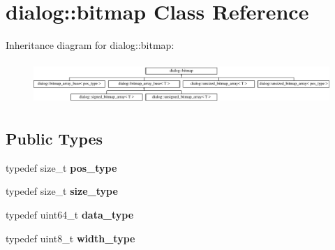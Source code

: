 \hypertarget{classdialog_1_1bitmap}{}\section{dialog\+:\+:bitmap Class Reference}
\label{classdialog_1_1bitmap}
Inheritance diagram for dialog\+:\+:bitmap\+:\begin{figure}[H]
\begin{center}
\leavevmode
\includegraphics[height=1.621622cm]{classdialog_1_1bitmap}
\end{center}
\end{figure}
\subsection*{Public Types}
\begin{DoxyCompactItemize}
\item 
\mbox{\label{classdialog_1_1bitmap_a9dad89abbacbfbf01882b42d105f8eab}} 
typedef size\+\_\+t {\bfseries pos\+\_\+type}
\item 
\mbox{\label{classdialog_1_1bitmap_a1f43213dbbee2916b2300f18cc0cf8e4}} 
typedef size\+\_\+t {\bfseries size\+\_\+type}
\item 
\mbox{\label{classdialog_1_1bitmap_a581f5b4b805e7227daff300d3e6889a1}} 
typedef uint64\+\_\+t {\bfseries data\+\_\+type}
\item 
\mbox{\label{classdialog_1_1bitmap_a32a35c8848493dfd325db63fa5d9522b}} 
typedef uint8\+\_\+t {\bfseries width\+\_\+type}
\end{DoxyCompactItemize}
